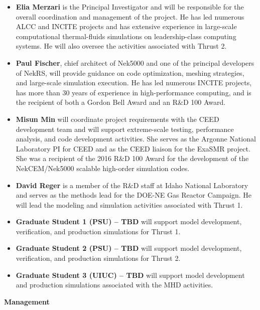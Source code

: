 \documentclass[11pt,letterpaper,english]{article}
\begin{document}
\vspace{-.15in}
\begin{itemize}
\item \textbf{Elia Merzari} is the Principal Investigator and will be responsible for the overall coordination and management of the project. He has led numerous ALCC and INCITE projects and has extensive experience in large-scale computational thermal-fluids simulations on leadership-class computing systems. He will also oversee the activities associated with Thrust 2.

\item \textbf{Paul Fischer}, chief architect of Nek5000 and one of the principal developers of NekRS, will provide guidance on code optimization, meshing strategies, and large-scale simulation execution. He has led numerous INCITE projects, has more than 30 years of experience in high-performance computing, and is the recipient of both a Gordon Bell Award and an R\&D 100 Award.

\item \textbf{Misun Min} will coordinate project requirements with the CEED development team and will support extreme-scale testing, performance analysis, and code development activities. She serves as the Argonne National Laboratory PI for CEED and as the CEED liaison for the ExaSMR project. She was a recipient of the 2016 R\&D 100 Award for the development of the NekCEM/Nek5000 scalable high-order simulation codes.

\item \textbf{David Reger} is a member of the R\&D staff at Idaho National Laboratory and serves as the methods lead for the DOE-NE Gas Reactor Campaign. He will lead the modeling and simulation activities associated with Thrust 1.

\item \textbf{Graduate Student 1 (PSU) -- TBD} will support model development, verification, and production simulations for Thrust 1.

\item \textbf{Graduate Student 2 (PSU) -- TBD} will support model development, verification, and production simulations for Thrust 2.

\item \textbf{Graduate Student 3 (UIUC) -- TBD} will support model development and production simulations associated with the MHD activities.
\end{itemize}

{\noindent \bf{Management}}
\end{document}
